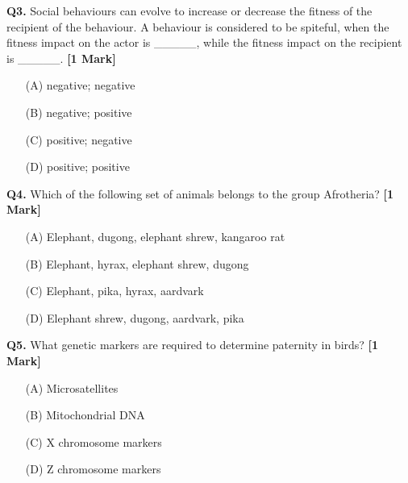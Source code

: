 \documentclass[11pt]{article}
\newcommand{\questiona}[2]{
    \noindent\textbf{Q#2.} #1 \hfill \textbf{[1 Mark]}
}
\begin{document}
\questiona{Social behaviours can evolve to increase or decrease the fitness of the recipient of the behaviour. A behaviour is considered to be spiteful, when the fitness impact on the actor is \_\_\_\_\_, while the fitness impact on the recipient is \_\_\_\_\_.}{3}
\begin{enumerate}
    \item[(A)] negative; negative  
    \item[(B)] negative; positive  
    \item[(C)] positive; negative  
    \item[(D)] positive; positive  
\end{enumerate}
\vspace{0.5cm}

\questiona{Which of the following set of animals belongs to the group Afrotheria?}{4}
\begin{enumerate}
    \item[(A)] Elephant, dugong, elephant shrew, kangaroo rat  
    \item[(B)] Elephant, hyrax, elephant shrew, dugong  
    \item[(C)] Elephant, pika, hyrax, aardvark  
    \item[(D)] Elephant shrew, dugong, aardvark, pika  
\end{enumerate}
\vspace{0.5cm}

\questiona{What genetic markers are required to determine paternity in birds?}{5}
\begin{enumerate}
    \item[(A)] Microsatellites  
    \item[(B)] Mitochondrial DNA  
    \item[(C)] X chromosome markers  
    \item[(D)] Z chromosome markers  
\end{enumerate}
\vspace{0.5cm}
\end{document}
